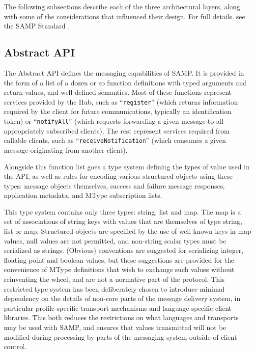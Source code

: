 \documentclass[5p]{elsarticle}
\begin{document}
The following subsections describe each of the three architectural layers,
along with some of the considerations that influenced their design.
For full details, see the SAMP Standard \citep{samp_std}.

\subsection{Abstract API}

The Abstract API defines the messaging capabilities of SAMP.
It is provided in the form of a list of a dozen or so function definitions
with typed arguments and return values, and well-defined semantics.
Most of these functions represent services provided by the Hub, such as
``{\tt register}'' (which returns information required by the
client for future communications, typically an identification token)
or ``{\tt notifyAll}'' (which requests forwarding a given message to
all appropriately subscribed clients).
The rest represent services required from callable clients, such as
``{\tt receiveNotification}'' (which consumes a given message originating
from another client).

Alongside this function list goes a type system defining the types of value
used in the API, as well as rules for encoding various structured objects
using these types: message objects themselves, success and failure
message responses, application metadata, and MType subscription lists.

This type system contains only three types:
string, list and map.
The map is a set of associations of string keys with
values that are themselves of type string, list or map.
Structured objects are specified by the use of well-known keys in map values,
null values are not permitted,
and non-string scalar types must be serialized as strings.
(Obvious) conventions are suggested for serializing
integer, floating point and boolean values,
but these suggestions are provided for the convenience
of MType definitions that wish to exchange such values without
reinventing the wheel, and are not a normative part of the protocol.
This restricted type system has been deliberately chosen to introduce
minimal dependency on the details of
non-core parts of the message delivery system,
in particular profile-specific transport mechanisms and language-specific
client libraries.
This both reduces the restrictions on what languages and transports
may be used with SAMP, and ensures that values transmitted will
not be modified during processing by parts of the messaging system
outside of client control.
\end{document}
